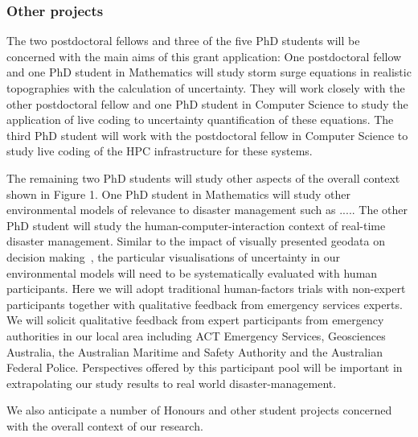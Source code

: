 \subsubsection*{Other projects}

The two postdoctoral fellows and three of the five PhD students 
will be concerned with the main aims of this grant application: One postdoctoral fellow and one PhD student in 
Mathematics will study storm surge equations in realistic topographies with the calculation of uncertainty. They will work closely with the other postdoctoral fellow 
and one PhD student in Computer Science to study the application of live coding to uncertainty quantification of these equations. The third
PhD student will work with the postdoctoral fellow in Computer Science to study  live coding of the HPC infrastructure for these systems.

The remaining two PhD students will study other aspects of the overall context shown in Figure 1. One PhD student in Mathematics will study other environmental models of relevance
to disaster management such as ..... The other PhD student will study the human-computer-interaction context of real-time disaster management. 
Similar to the impact of visually presented geodata on decision
making~\parencite{kinkeldey2015evaluating}, the particular
visualisations of uncertainty in our environmental models will need to
be systematically evaluated with human participants. Here we will
adopt traditional human-factors trials with non-expert participants
together with qualitative feedback from emergency services experts. We
will solicit qualitative feedback from expert participants from
emergency authorities in our local area including ACT Emergency
Services, Geosciences Australia, the Australian Maritime and Safety
Authority and the Australian Federal Police. Perspectives offered by
this participant pool will be important in extrapolating our study
results to real world disaster-management.

We also anticipate a number of Honours and other student projects concerned with the overall context of our research.



 



